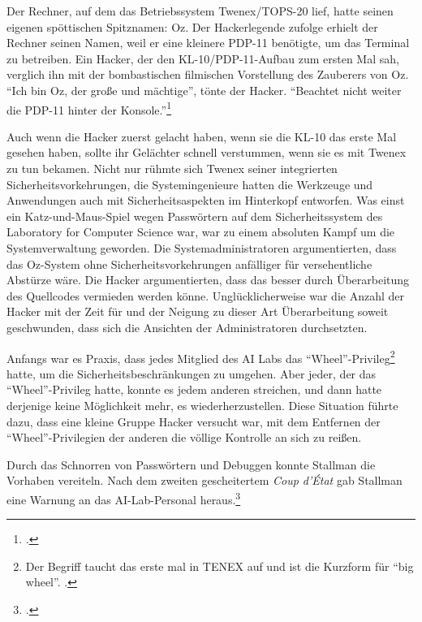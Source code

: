 Der Rechner, auf dem das Betriebssystem Twenex/TOPS-20 lief, hatte seinen eigenen spöttischen Spitznamen: Oz. Der Hackerlegende zufolge erhielt der Rechner seinen Namen, weil er eine kleinere PDP-11 benötigte, um das Terminal zu betreiben. Ein Hacker, der den KL-10/PDP-11-Aufbau zum ersten Mal sah, verglich ihn mit der bombastischen filmischen Vorstellung des Zauberers von Oz. "`Ich bin Oz, der große und mächtige"', tönte der Hacker. "`Beachtet nicht weiter die PDP-11 hinter der Konsole."'\footcite[Vgl.][]{fig1}

Auch wenn die Hacker zuerst gelacht haben, wenn sie die KL-10 das erste Mal gesehen haben, sollte ihr Gelächter schnell verstummen, wenn sie es mit Twenex zu tun bekamen. Nicht nur rühmte sich Twenex seiner integrierten Sicherheitsvorkehrungen, die Systemingenieure hatten die Werkzeuge und Anwendungen auch mit Sicherheitsaspekten im Hinterkopf entworfen. Was einst ein Katz-und-Maus-Spiel wegen Passwörtern auf dem Sicherheitssystem des Laboratory for Computer Science war, war zu einem absoluten Kampf um die Systemverwaltung geworden. Die Systemadministratoren argumentierten, dass das Oz-System ohne Sicherheitsvorkehrungen anfälliger für versehentliche Abstürze wäre. Die Hacker argumentierten, dass das besser durch Überarbeitung des Quellcodes vermieden werden könne. Unglücklicherweise war die Anzahl der Hacker mit der Zeit für und der Neigung zu dieser Art Überarbeitung soweit geschwunden, dass sich die Ansichten der Administratoren durchsetzten.

Anfangs war es Praxis, dass jedes Mitglied des AI Labs das "`Wheel"'-Privileg\footnote{Der Begriff taucht das erste mal in TENEX auf und ist die Kurzform für "`big wheel"'. \cite[Vgl.][Glossary: "`wheel"']{jargonf}.} hatte, um die Sicherheitsbeschränkungen zu umgehen. Aber jeder, der das "`Wheel"'-Privileg hatte, konnte es jedem anderen streichen, und dann hatte derjenige keine Möglichkeit mehr, es wiederherzustellen. Diese Situation führte dazu, dass eine kleine Gruppe Hacker versucht war, mit dem Entfernen der "`Wheel"'-Privilegien der anderen die völlige Kontrolle an sich zu reißen.

Durch das Schnorren von Passwörtern und Debuggen konnte Stallman die Vorhaben vereiteln. Nach dem zweiten gescheitertem \textit{Coup d'État} gab Stallman eine Warnung an das AI-Lab-Personal heraus.\footcite[Vgl.][]{rmskth}

